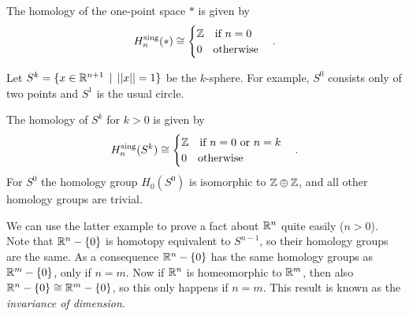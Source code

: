 \begin{example}
	The homology of the one-point space $\ast$ is given by
	$$ H^\text{sing}_n(\ast) \cong
	\begin{cases}
		\mathbb{Z} \quad\text{if } n = 0 \\
		0  \quad\text{otherwise}
	\end{cases}. $$
\end{example}
Let $S^k = \{ x \in \mathbb{R}^{n+1} \,\mid\, ||x|| = 1 \}$ be the $k$-sphere. For example, $S^0$ consists only of two points and $S^1$ is the usual circle.
\begin{example}
	The homology of $S^k$ for $k>0$ is given by
	$$ H^\text{sing}_n(S^k) \cong
	\begin{cases}
		\mathbb{Z} \quad\text{if } n = 0 \text { or } n = k \\
		0  \quad\text{otherwise}
	\end{cases}. $$
	For $S^0$ the homology group $H_0(S^0)$ is isomorphic to $\mathbb{Z} \oplus \mathbb{Z}$, and all other homology groups are trivial.
\end{example}

We can use the latter example to prove a fact about $\mathbb{R}^n$ quite easily ($n > 0$). Note that $\mathbb{R}^n - \{0\}$ is homotopy equivalent to $S^{n-1}$, so their homology groups are the same. As a consequence $\mathbb{R}^n - \{0\}$ has the same homology groups as $\mathbb{R}^m - \{0\}$, only if $n=m$. Now if $\mathbb{R}^n$ is homeomorphic to $\mathbb{R}^m$, then also $\mathbb{R}^n - \{0\} \cong \mathbb{R}^m - \{0\}$, so this only happens if $n=m$. This result is known as the \emph{invariance of dimension}.
